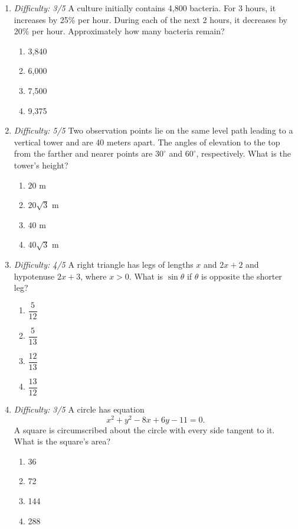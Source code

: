 \documentclass[12pt]{article}
\begin{document}
\begin{enumerate}[leftmargin=*,itemsep=1.2em,topsep=0.8em]
  \item \textit{Difficulty: 3/5} A culture initially contains 4,800 bacteria. For 3 hours, it increases by 25\% per hour. During each of the next 2 hours, it decreases by 20\% per hour. Approximately how many bacteria remain?
  \begin{enumerate}[label=\Alph*.,itemsep=0pt]
    \item 3,840 \item 6,000 \item 7,500 \item 9,375
  \end{enumerate}

  \item \textit{Difficulty: 5/5} Two observation points lie on the same level path leading to a vertical tower and are 40 meters apart. The angles of elevation to the top from the farther and nearer points are $30^\circ$ and $60^\circ$, respectively. What is the tower's height?
  \begin{enumerate}[label=\Alph*.,itemsep=0pt]
    \item $20$ m \item $20\sqrt3$ m \item $40$ m \item $40\sqrt3$ m
  \end{enumerate}

  \item \textit{Difficulty: 4/5} A right triangle has legs of lengths $x$ and $2x+2$ and hypotenuse $2x+3$, where $x>0$. What is $\sin\theta$ if $\theta$ is opposite the shorter leg?
  \begin{enumerate}[label=\Alph*.,itemsep=0pt]
    \item $\dfrac5{12}$ \item $\dfrac5{13}$ \item $\dfrac{12}{13}$ \item $\dfrac{13}{12}$
  \end{enumerate}

  \item \textit{Difficulty: 3/5} A circle has equation
  \[
    x^2+y^2-8x+6y-11=0.
  \]
  A square is circumscribed about the circle with every side tangent to it. What is the square's area?
  \begin{enumerate}[label=\Alph*.,itemsep=0pt]
    \item 36 \item 72 \item 144 \item 288
  \end{enumerate}


\end{enumerate}
\end{document}
